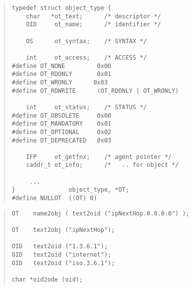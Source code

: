 



\begin{bwslide}

\begin{quote}\small\begin{verbatim}
typedef struct object_type {
    char   *ot_text;      /* descriptor */
    OID     ot_name;      /* identifier */

    OS      ot_syntax;    /* SYNTAX */

    int     ot_access;    /* ACCESS */
#define OT_NONE         0x00
#define OT_RDONLY       0x01
#define OT_WRONLY      0x03
#define OT_RDWRITE      (OT_RDONLY | OT_WRONLY)

    int     ot_status;    /* STATUS */
#define OT_OBSOLETE     0x00
#define OT_MANDATORY    0x01
#define OT_OPTIONAL     0x02
#define OT_DEPRECATED   0x03

    IFP     ot_getfnx;    /* agent pointer */
    caddr_t ot_info;      /*   .. for object */

     ...
}               object_type, *OT;
#define NULLOT  ((OT) 0)
\end{verbatim}\end{quote}
\end{bwslide}


\begin{bwslide}

\begin{quote}\small\begin{verbatim}
OT    name2obj ( text2oid ("ipNextHop.0.0.0.0") );

OT    text2obj ("ipNextHop");

OID   text2oid ("1.3.6.1");
OID   text2oid ("internet");
OID   text2oid ("iso.3.6.1");

char *oid2ode (oid);
\end{verbatim}\end{quote}
\end{bwslide}


